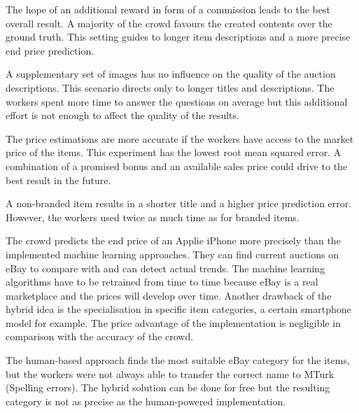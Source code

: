 The hope of an additional reward in form of a commission leads to the best overall result. A majority of the crowd favours the created contents over the ground truth. This setting guides to longer item descriptions and a more precise end price prediction.

A supplementary set of images has no influence on the quality of the auction descriptions. This scenario directs only to longer titles and descriptions. The workers spent more time to answer the questions on average but this additional effort is not enough to affect the quality of the results.

The price estimations are more accurate if the workers have access to the market price of the items. This experiment has the lowest root mean squared error. A combination of a promised bonus and an available sales price could drive to the best result in the future.

A non-branded item results in a shorter title and a higher price prediction error. However, the workers used twice as much time as for branded items.

The crowd predicts the end price of an Applie iPhone more precisely than the implemented machine learning approaches. They can find current auctions on eBay to compare with and can detect actual trends. The machine learning algorithms have to be retrained from time to time because eBay is a real marketplace and the prices will develop over time. Another drawback of the hybrid idea is the specialisation in specific item categories, a certain smartphone model for example. The price advantage of the implementation is negligible in comparison with the accuracy of the crowd.

The human-based approach finds the most suitable eBay category for the items, but the workers were not always able to transfer the correct name to MTurk (Spelling errors). The hybrid solution can be done for free but the resulting category is not as precise as the human-powered implementation.
